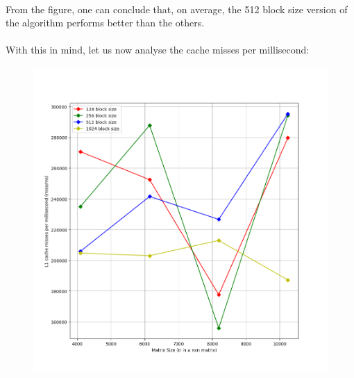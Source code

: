 \documentclass{report}
\begin{document}
			
				\paragraph{}From the figure, one can conclude that, on average, the 512 block size version of the algorithm performs better than the others.
				
				\paragraph{}With this in mind, let us now analyse the cache misses per millisecond:
				
				\begin{figure}[H]
					\begin{adjustbox}{center}
						\includegraphics[scale=0.4]{cpp_block_l1_misses.png}

\end{adjustbox}
\end{figure}
\end{document}

